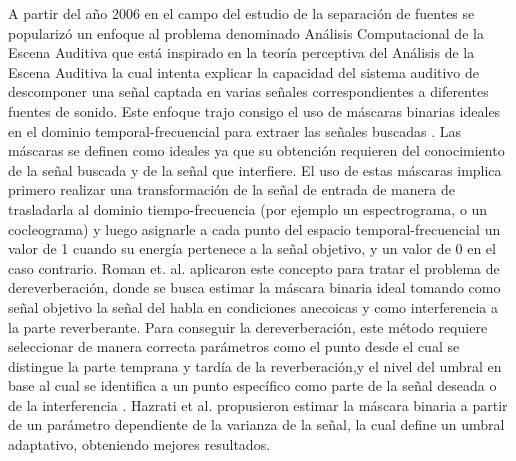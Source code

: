 A partir del año 2006 en el campo del estudio de la separación de fuentes se popularizó un enfoque al problema denominado Análisis Computacional de la Escena Auditiva \cite{CASA} que está inspirado en la teoría perceptiva del Análisis de la Escena Auditiva \cite{ASA} la cual intenta explicar la capacidad del sistema auditivo de descomponer una señal captada en varias señales correspondientes a diferentes fuentes de sonido. Este enfoque trajo consigo el uso de máscaras binarias ideales en el dominio temporal-frecuencial para extraer las señales buscadas \cite{binarymask}. Las máscaras se definen como ideales ya que su obtención requieren del conocimiento de la señal buscada y de la señal que interfiere. El uso de estas máscaras implica primero realizar una transformación de la señal de entrada de manera de trasladarla al dominio tiempo-frecuencia (por ejemplo un espectrograma, o un cocleograma) y luego asignarle a cada punto del espacio temporal-frecuencial un valor de 1 cuando su energía pertenece a la señal objetivo, y un valor de 0 en el caso contrario. Roman et. al. \cite{rev_mask} aplicaron este concepto para tratar el problema de dereverberación, donde se busca estimar la máscara binaria ideal tomando como señal objetivo la señal del habla en condiciones anecoicas y como interferencia a la parte reverberante. Para conseguir la dereverberación, este método requiere seleccionar de manera correcta parámetros como el punto desde el cual se distingue la parte temprana y tardía de la reverberación,y el nivel del umbral en base al cual se identifica a un punto específico como parte de la señal deseada o de la interferencia \cite{parametros}. Hazrati et al. \cite{hazrati} propusieron estimar la máscara binaria a partir de un parámetro dependiente de la varianza de la señal, la cual define un umbral adaptativo, obteniendo mejores resultados. 

